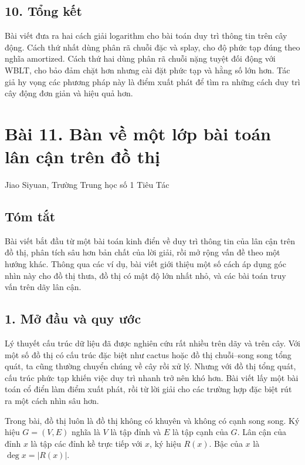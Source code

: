 \documentclass[11pt]{article}
\begin{document}
\subsection*{10. Tổng kết}

Bài viết đưa ra hai cách giải logarithm cho bài toán duy trì thông tin trên cây
động. Cách thứ nhất dùng phân rã chuỗi đặc và splay, cho độ phức tạp đúng theo
nghĩa amortized. Cách thứ hai dùng phân rã chuỗi nặng tuyệt đối động với WBLT,
cho bảo đảm chặt hơn nhưng cài đặt phức tạp và hằng số lớn hơn. Tác giả hy vọng
các phương pháp này là điểm xuất phát để tìm ra những cách duy trì cây động đơn
giản và hiệu quả hơn.

\section*{Bài 11. Bàn về một lớp bài toán lân cận trên đồ thị}

\begin{center}
Jiao Siyuan, Trường Trung học số 1 Tiêu Tác
\end{center}

\subsection*{Tóm tắt}

Bài viết bắt đầu từ một bài toán kinh điển về duy trì thông tin của lân cận
trên đồ thị, phân tích sâu hơn bản chất của lời giải, rồi mở rộng vấn đề theo
một hướng khác. Thông qua các ví dụ, bài viết giới thiệu một số cách áp dụng
góc nhìn này cho đồ thị thưa, đồ thị có mật độ lớn nhất nhỏ, và các bài toán
truy vấn trên dãy lân cận.

\subsection*{1. Mở đầu và quy ước}

Lý thuyết cấu trúc dữ liệu đã được nghiên cứu rất nhiều trên dãy và trên cây.
Với một số đồ thị có cấu trúc đặc biệt như cactus hoặc đồ thị chuỗi--song song
tổng quát, ta cũng thường chuyển chúng về cây rồi xử lý. Nhưng với đồ thị tổng
quát, cấu trúc phức tạp khiến việc duy trì nhanh trở nên khó hơn. Bài viết lấy
một bài toán cổ điển làm điểm xuất phát, rồi từ lời giải cho các trường hợp đặc
biệt rút ra một cách nhìn sâu hơn.

Trong bài, đồ thị luôn là đồ thị không có khuyên và không có cạnh song song.
Ký hiệu \(G=(V,E)\) nghĩa là \(V\) là tập đỉnh và \(E\) là tập cạnh của \(G\).
Lân cận của đỉnh \(x\) là tập các đỉnh kề trực tiếp với \(x\), ký hiệu
\(R(x)\). Bậc của \(x\) là \(\deg x=|R(x)|\).
\end{document}
